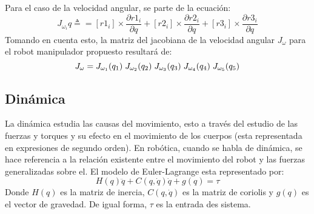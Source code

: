 \documentclass[journal, trans, spanish]{IEEEtran}
\begin{document}
Para el caso de la velocidad angular, se parte de la ecuación:
\begin{equation*}
    J_{\omega _i}q \triangleq = [r1_i] \times\frac{\partial r1_i}{\partial q} + [r2_i] \times\frac{\partial r2_i}{\partial q} + [r3_i] \times\frac{\partial r3_i}{\partial q}
\end{equation*}
Tomando en cuenta esto, la matriz del jacobiana de la velocidad angular $J_{\omega}$ para el robot manipulador propuesto resultará de:
\begin{equation*}
    J_\omega = J_{\omega_1}(q_1) \hspace{1mm} J_{\omega_2}(q_2) \hspace{1mm} J_{\omega_3}(q_3) \hspace{1mm} J_{\omega_4}(q_4) \hspace{1mm} J_{\omega_5}(q_5)
\end{equation*}

\subsection{Dinámica}
La dinámica estudia las causas del movimiento, esto a través del estudio de las fuerzas y torques y su efecto en el movimiento de los cuerpos (esta representada en expresiones de segundo orden). En robótica, cuando se habla de dinámica, se hace referencia a la relación existente entre el movimiento del robot y las fuerzas generalizadas sobre el. 
El modelo de Euler-Lagrange esta representado por: 
\begin{equation*}
    H(q)\ddot{q} + C(q, \dot{q}) \dot{q} + g(q) = \tau
\end{equation*}
Donde $H(q)$ es la matriz de inercia, $C(q, \dot{q})$ es la matriz de coriolis  y $g(q)$ es el vector de gravedad. De igual forma, $\tau$ es la entrada des sistema.\\ 
\end{document}
